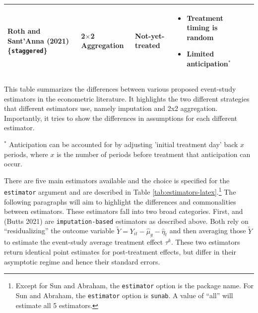 \begin{landscape}
\begin{table}
\begin{threeparttable}
\begin{tabular}{L{0.2\textwidth}L{0.2\textwidth}L{0.3\textwidth}p{0.5\textwidth}c}
Roth and Sant'Anna (2021) 
\{\texttt{staggered}\}
& 2$\times$2 Aggregation 
& Not-yet-treated 
& 
\vspace{-5mm}
\begin{itemize}[leftmargin=*]
  \item Treatment timing is random
  \item Limited anticipation${^*}$
\end{itemize}
& \\
\bottomrule
\end{tabular}

\begin{tablenotes}
\item { This table summarizes the differences between various proposed event-study estimators in the econometric literature. It highlights the two different strategies that different estimators use, namely imputation and 2x2 aggregation. Importantly, it tries to show the differences in assumptions for each different estimator.}
\item[$^{*}$] { Anticipation can be accounted for by adjusting 'initial treatment day' back $x$ periods, where $x$ is the number of periods before treatment that anticipation can occur.}
\end{tablenotes}

\end{threeparttable}
\end{table}
\end{landscape}

There are five main estimators available and the choice is specified for the \texttt{estimator} argument and are described in Table \ref{tab:estimators-latex}.\footnote{Except for Sun and Abraham, the \texttt{estimator} option is the package name. For Sun and Abraham, the \texttt{estimator} option is \texttt{sunab}. A value of ``all'' will estimate all 5 estimators.} The following paragraphs will aim to highlight the differences and commonalities between estimators. These estimators fall into two broad categories. First,  and  (Butts 2021) are \texttt{imputation-based} estimators as described above. Both rely on ``residualizing'' the outcome variable \(\tilde{Y} = Y_{it} - \hat{\mu}_g - \hat{\eta}_t\) and then averaging those \(\tilde{Y}\) to estimate the event-study average treatment effect \(\tau^k\). These two estimators return identical point estimates for post-treatment effects, but differ in their asymptotic regime and hence their standard errors.

